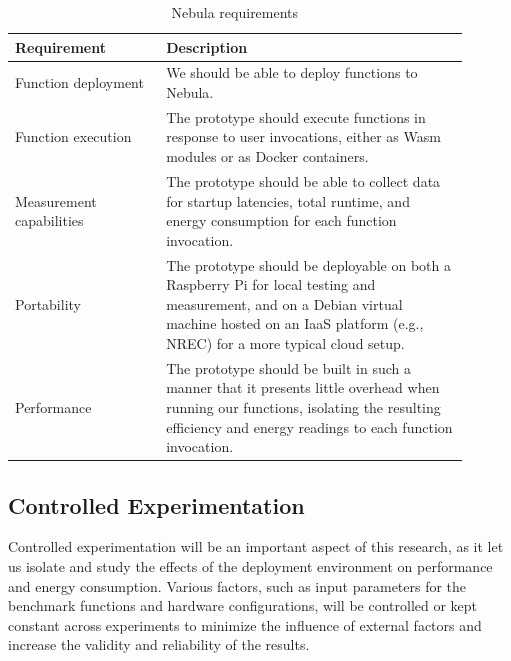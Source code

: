 \documentclass[
  table]{report}
\begin{document}
\begin{table}[!ht]
\centering
\caption{Nebula requirements}
\begin{tabular}{@{}p{0.3\linewidth}@{\hskip\tabcolsep}p{0.6\linewidth}@{}}
\toprule
\textbf{Requirement} & \textbf{Description} \\
\midrule

\rowcolor{green!10} Function deployment & We should be able to deploy functions
to Nebula. \\

Function execution & The prototype should execute functions in response to user
invocations, either as \ac{Wasm} modules or as Docker containers.  \\

\rowcolor{blue!10} Measurement \parbox{0.9\linewidth}{capabilities} & The prototype should be able
to collect data for startup latencies, total runtime, and energy consumption for
each function invocation. \\

Portability & The prototype should be deployable on both a
Raspberry Pi for local testing and measurement, and on a Debian virtual machine
hosted on an IaaS platform (e.g., \ac{NREC}) for a more typical cloud setup. \\

 Performance & The prototype should be built in such a
manner that it presents little overhead when running our functions, isolating
the resulting efficiency and energy readings to each function invocation. \\

\bottomrule
\end{tabular}
\label{table:nebula_requirements}
\end{table}

\subsection{Controlled Experimentation}
\label{sect:controleld_experimentation}

Controlled experimentation will be an important aspect of this research,
as it let us isolate and study the effects of the deployment environment
on performance and energy consumption. Various factors, such as input
parameters for the benchmark functions and hardware configurations, will
be controlled or kept constant across experiments to minimize the
influence of external factors and increase the validity and reliability
of the results.
\end{document}
